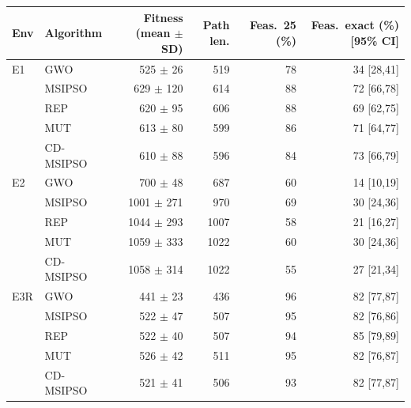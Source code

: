 \begin{tabular}{llrrrr}
\toprule
Env & Algorithm & Fitness (mean $\pm$ SD) & Path len. & Feas.\ 25 (\%) & Feas.\ exact (\%) [95\% CI]\\
\midrule
E1 & GWO & 525 $\pm$ 26 & 519 & 78 & 34 [28,41]\\
 & MSIPSO & 629 $\pm$ 120 & 614 & 88 & 72 [66,78]\\
 & REP & 620 $\pm$ 95 & 606 & 88 & 69 [62,75]\\
 & MUT & 613 $\pm$ 80 & 599 & 86 & 71 [64,77]\\
 & CD-MSIPSO & 610 $\pm$ 88 & 596 & 84 & 73 [66,79]\\
\midrule
E2 & GWO & 700 $\pm$ 48 & 687 & 60 & 14 [10,19]\\
 & MSIPSO & 1001 $\pm$ 271 & 970 & 69 & 30 [24,36]\\
 & REP & 1044 $\pm$ 293 & 1007 & 58 & 21 [16,27]\\
 & MUT & 1059 $\pm$ 333 & 1022 & 60 & 30 [24,36]\\
 & CD-MSIPSO & 1058 $\pm$ 314 & 1022 & 55 & 27 [21,34]\\
\midrule
E3R & GWO & 441 $\pm$ 23 & 436 & 96 & 82 [77,87]\\
 & MSIPSO & 522 $\pm$ 47 & 507 & 95 & 82 [76,86]\\
 & REP & 522 $\pm$ 40 & 507 & 94 & 85 [79,89]\\
 & MUT & 526 $\pm$ 42 & 511 & 95 & 82 [76,87]\\
 & CD-MSIPSO & 521 $\pm$ 41 & 506 & 93 & 82 [77,87]\\
\bottomrule
\end{tabular}